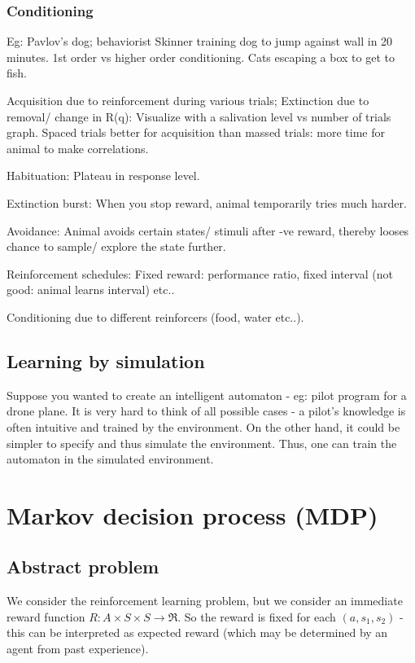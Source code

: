 \documentclass[oneside, article]{memoir}
\begin{document}
\subsubsection{Conditioning}
Eg: Pavlov's dog; behaviorist Skinner training dog to jump against wall in 20 minutes. 1st order vs higher order conditioning. Cats escaping a box to get to fish.

Acquisition due to reinforcement during various trials; Extinction due to removal/ change in R(q): Visualize with a salivation level vs number of trials graph. Spaced trials better for acquisition than massed trials: more time for animal to make correlations.

Habituation: Plateau in response level.

Extinction burst: When you stop reward, animal temporarily tries much harder.

Avoidance: Animal avoids certain states/ stimuli after -ve reward, thereby looses chance to sample/ explore the state further.

Reinforcement schedules: Fixed reward: performance ratio, fixed interval (not good: animal learns interval) etc..

Conditioning due to different reinforcers (food, water etc..).

\subsection{Learning by simulation}
Suppose you wanted to create an intelligent automaton - eg: pilot program for a drone plane. It is very hard to think of all possible cases - a pilot's knowledge is often intuitive and trained by the environment. On the other hand, it could be simpler to specify and thus simulate the environment. Thus, one can train the automaton in the simulated environment.

\section{Markov decision process (MDP)}
\subsection{Abstract problem}
We consider the reinforcement learning problem, but we consider an immediate reward function $R: A \times S \times S \to \Re$. So the reward is fixed for each $(a, s_1, s_2)$ - this can be interpreted as expected reward (which may be determined by an agent from past experience).
\end{document}

